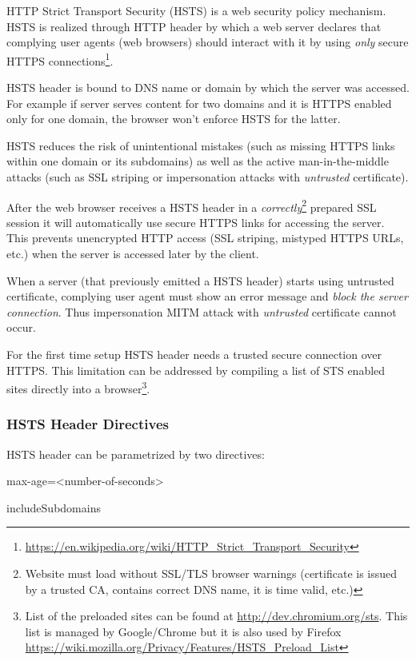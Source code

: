 HTTP Strict Transport Security (HSTS) is a web security policy mechanism. HSTS is realized through HTTP header by which a web server declares that complying user agents (web browsers) should interact with it by using \emph{only} secure HTTPS connections\footnote{\url{https://en.wikipedia.org/wiki/HTTP_Strict_Transport_Security}}. 

HSTS header is bound to DNS name or domain by which the server was accessed. For example if server serves content for two domains and it is HTTPS enabled only for one domain, the browser won't enforce HSTS for the latter. 

HSTS reduces the risk of unintentional mistakes (such as missing HTTPS links within one domain or its subdomains) as well as the active man-in-the-middle attacks (such as SSL striping or impersonation attacks with \emph{untrusted} certificate). 

After the web browser receives a HSTS header in a \emph{correctly}\footnote{Website must load without SSL/TLS browser warnings (certificate is issued by a trusted CA, contains correct DNS name, it is time valid, etc.)} prepared SSL session it will automatically use secure HTTPS links for accessing the server. This prevents unencrypted HTTP access (SSL striping, mistyped HTTPS URLs, etc.) when the server is accessed later by the client. 

When a server (that previously emitted a HSTS header) starts using untrusted certificate, complying user agent must show an error message and \emph{block the server connection}. Thus impersonation MITM attack with \emph{untrusted} certificate cannot occur.

For the first time setup HSTS header needs a trusted secure connection over HTTPS. This limitation can be addressed by compiling a list of STS enabled sites  directly into a browser\footnote{List of the preloaded sites can be found at \url{http://dev.chromium.org/sts}. This list is managed by Google/Chrome but it is also used by Firefox \url{https://wiki.mozilla.org/Privacy/Features/HSTS_Preload_List}}. 

\subsubsection{HSTS Header Directives}
\label{subsubsection:HSTS Header Directives}
HSTS header can be parametrized by two directives:
\begin{itemize*}
  \item max-age=<number-of-seconds> 
	\item includeSubdomains 
\end{itemize*}

